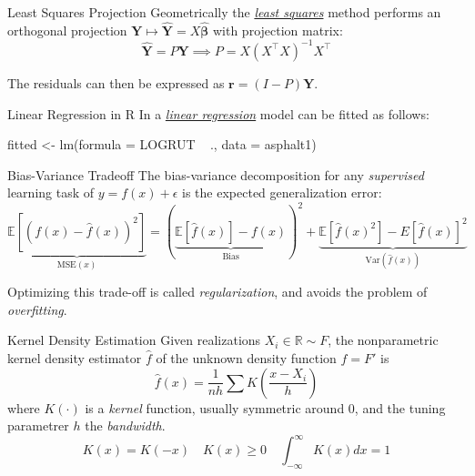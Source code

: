 \documentclass{cognito}
\begin{document}
\begin{note}{Least Squares Projection}
	Geometrically the \hyperref[note:Least Squares Estimator]{\it least squares} method
	performs an orthogonal projection $\bm{Y} \mapsto \hat{\bm{Y}} = X\hat{\bm{\beta}}$ with projection matrix:
	$$
		 \hat{\bm{Y}} = P\bm{Y} \implies P = X (X^\intercal X)^{-1} X^\intercal
	$$
	\begin{remark} The residuals can then be expressed as $\mathbf{r} = (I - P)\bm{Y}$.\end{remark}
	\vspace{-5pt}
\end{note}

\begin{note}{Linear Regression in R}
	In  a \hyperref[note:Multiple Linear Regression]{\it linear regression} model can be fitted as follows:
	\begin{code}
fitted <- lm(formula = LOGRUT ~ ., data = asphalt1)
	\end{code}
	\vspace{-5pt}
\end{note}

\begin{note}{Bias-Variance Tradeoff}
	The bias-variance decomposition
	for any \emph{supervised} learning task of $y = f(x) + \epsilon$ is the expected generalization error:
	$$
		\underbrace{\mathds{E}[(f(x) - \hat{f}(x))^2]}_{\text{MSE}(x)} = (\underbrace{\mathds{E}[\hat{f}(x)] - f(x)}_{\text{Bias}})^2
		+ \underbrace{\mathds{E}[\hat{f}(x)^2] - E[\hat{f}(x)]^2}_{\text{Var}(\hat{f}(x))}
	$$
	\begin{remark} Optimizing this trade-off is called \emph{regularization}, and avoids the problem of \emph{overfitting}.
	\end{remark}
	\vspace{-5pt}
\end{note}



\begin{note}{Kernel Density Estimation}
	Given realizations $X_i \in \mathds{R} \sim F$, the nonparametric kernel density estimator $\hat{f}$
	of the unknown density function $f = F'$ is
	$$
		\hat{f}(x) = \frac{1}{nh} \sum K\left(\frac{x - X_i}{h}\right)
	$$
	where $K(\cdot)$ is a \emph{kernel} function, usually symmetric around 0, and the tuning parametrer $h$ the \emph{bandwidth}.
	$$
		\textstyle K(x) = K(-x) \quad K(x) \geq 0 \quad \int_{-\infty}^\infty K(x) dx = 1
	$$
	\vspace{-10pt}
\end{note}
\end{document}
